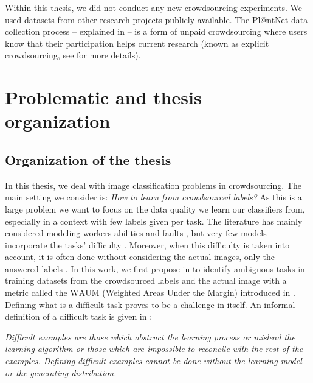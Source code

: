 Within this thesis, we did not conduct any new crowdsourcing experiments.
We used datasets from other research projects publicly available.
The Pl@ntNet data collection process -- explained in  -- is a form of unpaid crowdsourcing where users know that their participation helps current research (known as explicit crowdsourcing, see  for more details).

\section{Problematic and thesis organization}

\subsection{Organization of the thesis}

In this thesis, we deal with image classification problems in crowdsourcing.
The main setting we consider is: \emph{How to learn from crowdsourced labels?}
As this is a large problem we want to focus on the data quality we learn our classifiers from, especially in a context with few labels given per task.
The literature has mainly considered modeling workers abilities and faults \citep{dawid_maximum_1979, raykar_ranking_2011, sinha2018fast,rodrigues2018deep},
but very few models incorporate the tasks' difficulty \citep{whitehill_whose_2009,chu2021learning}.
Moreover, when this difficulty is taken into account, it is often done without considering the actual images, only the answered labels \citep{whitehill_whose_2009}.
In this work, we first propose in  to identify ambiguous tasks in training datasets from the crowdsourced labels and the actual image with a metric called the $\mathrm{WAUM}$ (Weighted Areas Under the Margin) introduced in \citep{lefort2022improve}.
Defining what is a difficult task proves to be a challenge in itself.
An informal definition of a difficult task is given in \citep{angelova2004data}:
\begin{center}
\begin{minipage}{.75\textwidth}
\emph{
Difficult examples are those which obstruct the learning process or mislead the learning algorithm or those which are impossible to reconcile with the rest of the examples. Defining difficult examples cannot be done without the learning model or the generating distribution.
}
\end{minipage}
\end{center}

